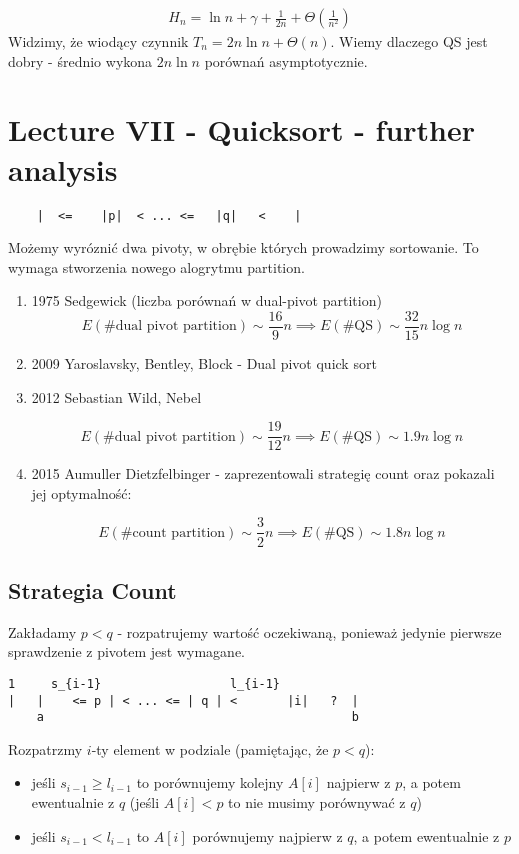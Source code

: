 \documentclass{article}
\numberwithin{equation}{subsection}
\begin{document}
\begin{align}
    H_n = \ln n + \gamma + \frac{1}{2n} + \Theta\left(\frac{1}{n^2}\right)
\end{align}
Widzimy, że wiodący czynnik $T_n = 2n\ln n + \Theta(n)$.
Wiemy dlaczego QS jest dobry - średnio wykona $2n\ln n$ porównań asymptotycznie.

\section{Lecture VII - Quicksort - further analysis}

\begin{verbatim}
    |  <=    |p|  < ... <=   |q|   <    |
\end{verbatim}

Możemy wyróznić dwa pivoty, w obrębie których prowadzimy sortowanie. 
To wymaga stworzenia nowego alogrytmu partition. 

\begin{enumerate}

\item 1975 Sedgewick (liczba porównań w dual-pivot partition) 
\[
    E(\text{\# dual pivot partition})\sim \frac{16}{9} n \implies E(\text{\# QS}) \sim \frac{32}{15} n\log n
\]

\item 2009 Yaroslavsky, Bentley, Block - Dual pivot quick sort

\item 2012 Sebastian Wild, Nebel

\[
    E(\text{\# dual pivot partition})\sim \frac{19}{12} n \implies E(\text{\# QS}) \sim 1.9 n\log n
\]

\item 2015 Aumuller Dietzfelbinger - zaprezentowali strategię count oraz pokazali jej optymalność:

\[
    E(\text{\# count partition})\sim \frac{3}{2} n \implies E(\text{\# QS}) \sim 1.8 n\log n
\]
\end{enumerate}

\subsection{Strategia Count}

Zakładamy $p < q$ - rozpatrujemy wartość oczekiwaną, ponieważ jedynie pierwsze sprawdzenie z pivotem jest wymagane.

\begin{verbatim}
1     s_{i-1}                  l_{i-1}
|   |    <= p | < ... <= | q | <       |i|   ?  |
    a                                           b
\end{verbatim}
Rozpatrzmy $i$-ty element w podziale (pamiętając, że $p < q$):
\begin{itemize}
    \item jeśli $s_{i-1} \geq l_{i-1}$ to porównujemy kolejny $A[i]$ najpierw z $p$, a potem ewentualnie z $q$
    (jeśli $A[i] < p$ to nie musimy porównywać z $q$)
    \item jeśli $s_{i-1} < l_{i-1}$ to $A[i]$ porównujemy najpierw z $q$, a potem ewentualnie z $p$
\end{itemize}
\end{document}
